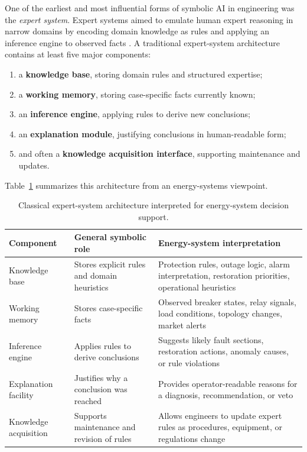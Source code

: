 One of the earliest and most influential forms of symbolic AI in engineering was the \emph{expert system}. Expert systems aimed to emulate human expert reasoning in narrow domains by encoding domain knowledge as rules and applying an inference engine to observed facts \cite{buchanan1984rulebased,giarratano2005expert}. A traditional expert-system architecture contains at least five major components:
\begin{enumerate}
	\item a \textbf{knowledge base}, storing domain rules and structured expertise;
	\item a \textbf{working memory}, storing case-specific facts currently known;
	\item an \textbf{inference engine}, applying rules to derive new conclusions;
	\item an \textbf{explanation module}, justifying conclusions in human-readable form;
	\item and often a \textbf{knowledge acquisition interface}, supporting maintenance and updates.
\end{enumerate}

Table~\ref{tab:expert_system_architecture} summarizes this architecture from an energy-systems viewpoint.

\begin{table}[H]
	\centering
	\caption{Classical expert-system architecture interpreted for energy-system decision support.}
	\label{tab:expert_system_architecture}
	\small
	\begin{tabular}{|p{3.5cm}|p{5.5cm}|p{5.5cm}|}
		\hline
		\textbf{Component} & \textbf{General symbolic role} & \textbf{Energy-system interpretation} \\
		\hline
		Knowledge base & Stores explicit rules and domain heuristics & Protection rules, outage logic, alarm interpretation, restoration priorities, operational heuristics \\
		\hline
		Working memory & Stores case-specific facts & Observed breaker states, relay signals, load conditions, topology changes, market alerts \\
		\hline
		Inference engine & Applies rules to derive conclusions & Suggests likely fault sections, restoration actions, anomaly causes, or rule violations \\
		\hline
		Explanation facility & Justifies why a conclusion was reached & Provides operator-readable reasons for a diagnosis, recommendation, or veto \\
		\hline
		Knowledge acquisition & Supports maintenance and revision of rules & Allows engineers to update expert rules as procedures, equipment, or regulations change \\
		\hline
	\end{tabular}
\end{table}

